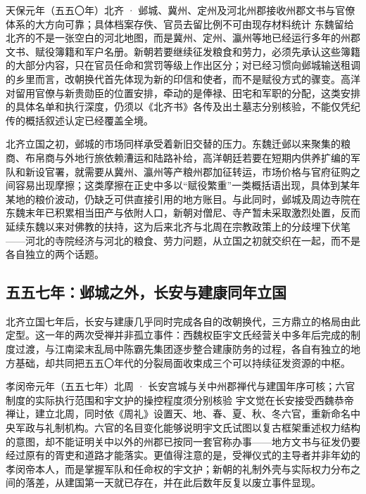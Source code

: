 \begin{event}{}{天保元年（五五〇年）}{北齐 · 邺城、冀州、定州及河北州郡}{接收州郡文书与官僚体系的大方向可靠；具体档案存佚、官员去留比例不可由现存材料统计}
东魏留给北齐的不是一张空白的河北地图，而是冀州、定州、瀛州等地已经运行多年的州郡文书、赋役簿籍和军户名册。新朝若要继续征发粮食和劳力，必须先承认这些簿籍的大部分内容，只在官员任命和赏罚等级上作出区分；对已经习惯向邺城输送租调的乡里而言，改朝换代首先体现为新的印信和使者，而不是赋役方式的骤变。高洋对留用官僚与新贵勋臣的位置安排，牵动的是俸禄、田宅和军职的分配，这类安排的具体名单和执行深度，仍须以《北齐书》各传及出土墓志分别核验，不能仅凭纪传的概括叙述认定已经覆盖全境。
\end{event}

北齐立国之初，邺城的市场同样承受着新旧交替的压力。东魏迁邺以来聚集的粮商、布帛商与外地行旅依赖漕运和陆路补给，高洋朝廷若要在短期内供养扩编的军队和新设官署，就需要从冀州、瀛州等产粮州郡加征转运，市场价格与官府征购之间容易出现摩擦；这类摩擦在正史中多以“赋役繁重”一类概括语出现，具体到某年某地的粮价波动，仍缺乏可供直接引用的地方账目。与此同时，邺城及周边寺院在东魏末年已积累相当田产与依附人口，新朝对僧尼、寺产暂未采取激烈处置，反而延续东魏以来对佛教的扶持，这为后来北齐与北周在宗教政策上的分歧埋下伏笔——河北的寺院经济与河北的粮食、劳力问题，从立国之初就交织在一起，而不是各自独立的两个话题。

\subsection{五五七年：邺城之外，长安与建康同年立国}

北齐立国七年后，长安与建康几乎同时完成各自的改朝换代，三方鼎立的格局由此定型。这一年的两次受禅并非孤立事件：西魏权臣宇文氏经营关中多年后完成的制度过渡，与江南梁末乱局中陈霸先集团逐步整合建康防务的过程，各自有独立的地方基础，却共同把五五〇年代的分裂局面收束成三个可以持续征发资源的中枢。

\begin{event}{}{孝闵帝元年（五五七年）}{北周 · 长安宫城与关中州郡}{禅代与建国年序可核；六官制度的实际执行范围和宇文护的操控程度须分别核验}
宇文觉在长安接受西魏恭帝禅让，建立北周，同时依《周礼》设置天、地、春、夏、秋、冬六官，重新命名中央军政与礼制机构。六官的名目变化能够说明宇文氏试图以复古框架重述权力结构的意图，却不能证明关中以外的州郡已按同一套官称办事——地方文书与征发仍要经过原有的胥吏和道路才能落实。更值得注意的是，受禅仪式的主导者并非年幼的孝闵帝本人，而是掌握军队和任命权的宇文护；新朝的礼制外壳与实际权力分布之间的落差，从建国第一天就已存在，并在此后数年反复以废立事件显现。
\end{event}

